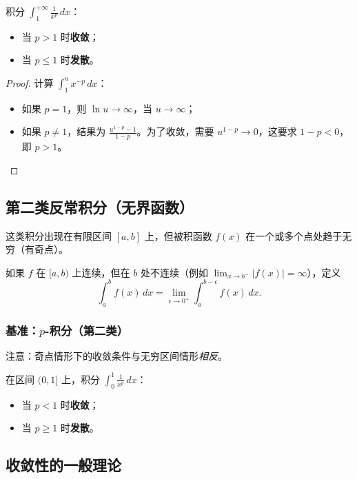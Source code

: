 \begin{theorem}
积分 $\int_1^{+\infty}\frac{1}{x^p}\,dx$：
\begin{itemize}
    \item 当 $p>1$ 时\textbf{收敛}；
    \item 当 $p\le 1$ 时\textbf{发散}。
\end{itemize}
\end{theorem}
\begin{proof}
计算 $\int_1^u x^{-p}\,dx$：
\begin{itemize}
    \item 如果 $p=1$，则 $\ln u\to\infty$，当 $u\to\infty$；
    \item 如果 $p\ne 1$，结果为 $\frac{u^{1-p}-1}{1-p}$。为了收敛，需要 $u^{1-p}\to 0$，这要求 $1-p<0$，即 $p>1$。
\end{itemize}
\end{proof}

\subsection{第二类反常积分（无界函数）}

这类积分出现在有限区间 $[a,b]$ 上，但被积函数 $f(x)$ 在一个或多个点处趋于无穷（有奇点）。

\begin{definition}
如果 $f$ 在 $[a,b)$ 上连续，但在 $b$ 处不连续（例如 $\lim_{x\to b^-}|f(x)|=\infty$），定义
\[
\int_a^b f(x)\,dx=\lim_{\epsilon\to 0^+}\int_a^{b-\epsilon}f(x)\,dx.
\]
\end{definition}

\subsubsection{基准：$p$-积分（第二类）}
注意：奇点情形下的收敛条件与无穷区间情形\textit{相反}。

\begin{theorem}
在区间 $(0,1]$ 上，积分 $\int_0^1\frac{1}{x^p}\,dx$：
\begin{itemize}
    \item 当 $p<1$ 时\textbf{收敛}；
    \item 当 $p\ge 1$ 时\textbf{发散}。
\end{itemize}
\end{theorem}

\subsection{收敛性的一般理论}


